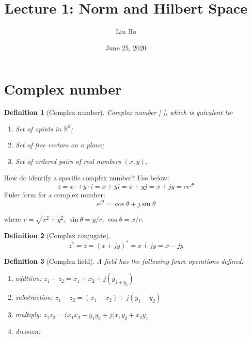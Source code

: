 \documentclass[11pt]{article}
\title{Lecture 1: Norm and Hilbert Space}
\author{Liu Bo}
\date{June 25, 2020}
\newtheorem{definition}{Definition}
\begin{document}
\maketitle

\section{Complex number}
\begin{definition}[Complex number]
Complex number [ ], which is quivalent to:

\begin{enumerate}
\item Set of opints in $\mathbb{R}^2$;
\item Set of free vectors on a plane;
\item Set of ordered pairs of real numbers $(x, y)$.
\end{enumerate}
\end{definition}
How do identify a specific complex number? Use below:
\begin{displaymath}
z = x\cdot + y\cdot i = x + yi = x + yj = x + jy = re^{j\theta}
\end{displaymath}
Euler form for a complex number:
\begin{displaymath}
e^{j\theta} = \cos{\theta} + j\sin{\theta}
\end{displaymath}

where $r = \sqrt{x^2+y^2}$, $\sin{\theta} = y/r$, $\cos{\theta} = x/r$.

\begin{definition}[Complex conjugate]
\begin{displaymath}
z^\ast = \overline{z} = (x + jy)^\ast = \overline{x + jy} = x - jy
\end{displaymath}
\end{definition}

\begin{definition}[Complex field]
A field has the following foure operations defined:
\begin{enumerate}
\item addtiion: $z_{1}+z_{2} = x_{1} + x_{2} + j(y_{1+y_2})$
\item substraction: $z_{1} - z_{2} = (x_{1} - x_{2}) + j(y_{1} - y_{2})$
\item multiply: $z_{1} z_{2} = (x_{1} x_{2} - y_{1} y_{2} + j(x_{1} y_{2} + x_{2} y_{1}$
\item division:
\end{enumerate}
\end{definition}
\end{document}
